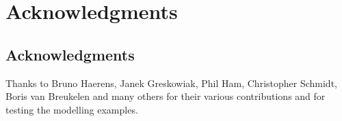 \chapter*{Acknowledgments}


\def\shorttitle{Acknowledgments}

\section*{Acknowledgments}

Thanks to Bruno Haerens, Janek Greskowiak, Phil Ham, Christopher Schmidt, Boris van Breukelen and many others for their various contributions and for testing the modelling examples.